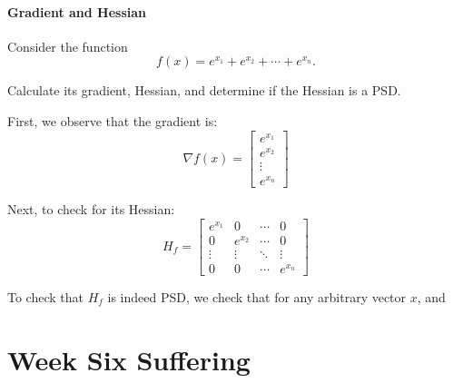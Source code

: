 \documentclass[openany]{book}
\begin{document}
\subsubsection{Gradient and Hessian}
\begin{hw}
	Consider the function
	\begin{equation*}
		f(x) = e^{x_1} + e^{x_2} + \cdots + e^{x_n}.
	\end{equation*}

	Calculate its gradient, Hessian, and determine if the Hessian is a PSD.
\end{hw}
\begin{solution}
	First, we observe that the gradient is:
	\begin{equation*}
		\nabla f(x) = 
		\begin{bmatrix}
			e^{x_1} \\ e^{x_2} \\ \vdots \\ e^{x_n}
		\end{bmatrix}
	\end{equation*}

	Next, to check for its Hessian:
	\begin{equation*}
		H_f = \begin{bmatrix}
			e^{x_1} & 0 & \cdots & 0 \\
			0 & e^{x_2} & \cdots & 0 \\
			\vdots & \vdots & \ddots & \vdots \\
			0 & 0 & \cdots & e^{x_n}
		\end{bmatrix}
	\end{equation*}

	To check that $H_f$ is indeed PSD, we check that for any arbitrary vector $x$, and
\end{solution}

\chapter{Week Six Suffering}
\end{document}
